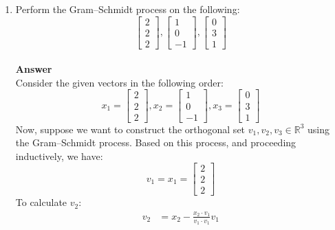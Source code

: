 \documentclass[11pt]{article}
\theoremstyle{definition}
\begin{document}
\begin{enumerate}
	\item Perform the Gram--Schmidt process on the following:
	\begin{equation*}
		\begin{bmatrix} 2 \\ 2 \\ 2 \end{bmatrix}, \begin{bmatrix} 1 \\ 0 \\ -1 \end{bmatrix}, \begin{bmatrix} 0 \\ 3 \\ 1 \end{bmatrix}
	\end{equation*}
        \\
            \textbf{Answer}
        \\
        Consider the given vectors in the following order:
        \begin{equation*}
		x_1 = \begin{bmatrix} 2 \\ 2 \\ 2 \end{bmatrix}, 
            x_2 = \begin{bmatrix} 1 \\ 0 \\ -1 \end{bmatrix}, 
            x_3 =\begin{bmatrix} 0 \\ 3 \\ 1 \end{bmatrix}
        \end{equation*}
        Now, suppose we want to construct the orthogonal set $v_1, v_2, v_3 \in \mathbb{R}^3$ using the Gram--Schmidt process. Based on this process, and proceeding inductively, we have:
        \[v_1 = x_1 = \begin{bmatrix} 2 \\ 2 \\ 2 \end{bmatrix}\]
        To calculate $v_2$:
        \begin{align*}
            v_2 
            & = x_2 - \frac{x_2 \cdot v_1}{v_1 \cdot v_1}v_1 \\

\end{align*}
\end{enumerate}
\end{document}
